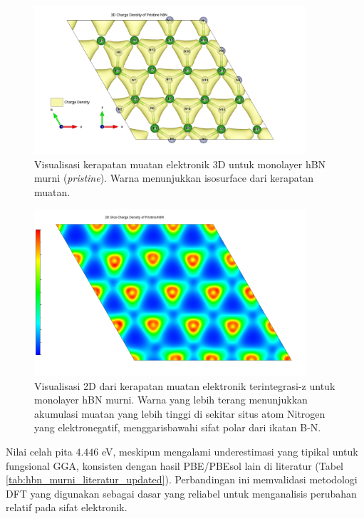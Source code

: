 \begin{figure}[h!]
    \centering
    \includegraphics[width=0.9\textwidth]{gambar_hasil/hBN_rho_3d_pristine.png}
    \caption{Visualisasi kerapatan muatan elektronik 3D untuk monolayer hBN murni (\textit{pristine}). Warna menunjukkan isosurface dari kerapatan muatan.}
    \label{fig:hbn_pristine_chargedensity}
\end{figure}

\begin{figure}[h!]
    \centering
    \includegraphics[width=0.9\textwidth]{gambar_hasil/hBN_rho_pristine.png}
    \caption{Visualisasi 2D dari kerapatan muatan elektronik terintegrasi-z untuk monolayer hBN murni. Warna yang lebih terang menunjukkan akumulasi muatan yang lebih tinggi di sekitar situs atom Nitrogen yang elektronegatif, menggarisbawahi sifat polar dari ikatan B-N.}
    \label{fig:hbn_pristine_chargedensity_2D}
\end{figure}

Nilai celah pita $4.446$ eV, meskipun mengalami underestimasi yang tipikal untuk fungsional GGA, konsisten dengan hasil PBE/PBEsol lain di literatur (Tabel \ref{tab:hbn_murni_literatur_updated}). Perbandingan ini memvalidasi metodologi DFT yang digunakan sebagai dasar yang reliabel untuk menganalisis perubahan relatif pada sifat elektronik.


